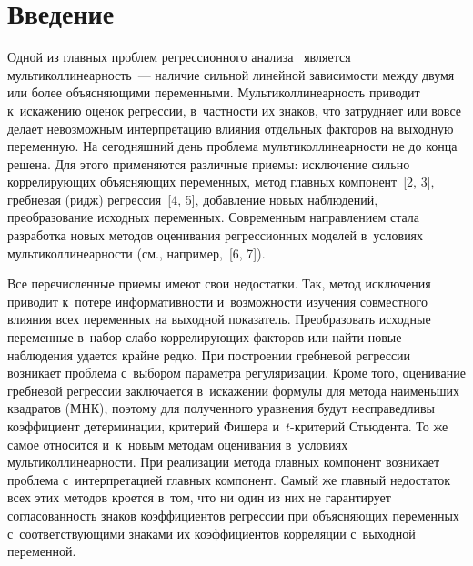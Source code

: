   
\vspace*{-4pt}



\thispagestyle{headings}

\begin{multicols}{2}

\label{st\stat}
  
\section{Введение}

\vspace*{-4pt}
  
  Одной из главных проблем регрессионного анализа~\cite{1-baz} является 
мультиколлинеарность~--- наличие сильной линейной за\-ви\-си\-мости меж\-ду 
двумя или более объ\-яс\-ня\-ющи\-ми переменными. Мультиколлинеарность 
приводит к~искажению оценок регрессии, в~част\-ности их знаков, что 
затрудняет или вовсе делает невозможным интерпретацию влияния отдельных 
факторов на выходную переменную. На сегодняшний день проб\-ле\-ма 
муль\-ти\-кол\-ли\-не\-ар\-ности не до конца решена. Для этого применяются различные 
приемы: исключение сильно кор\-ре\-ли\-ру\-ющих объ\-яс\-ня\-ющих переменных, метод 
главных компонент~[2, 3], греб\-не\-вая (ридж) ре\-грес\-сия~[4, 5], до\-бав\-ле\-ние новых 
наблюдений, преобразование исходных переменных. Современным 
на\-прав\-ле\-ни\-ем стала разработка новых методов оценивания регрессионных 
моделей в~условиях муль\-ти\-кол\-ли\-не\-ар\-ности (см., например,~[6, 7]). 

Все 
пе\-ре\-чис\-лен\-ные приемы имеют свои недостатки. Так, метод исключения 
приводит к~потере ин\-фор\-ма\-тив\-ности и~воз\-мож\-ности изуче\-ния совместного 
влияния всех переменных на выходной показатель. Преобразовать исходные 
переменные в~набор слабо кор\-ре\-ли\-ру\-ющих факторов или найти новые 
наблюдения удается крайне ред\-ко. При по\-стро\-ении греб\-не\-вой регрессии 
возникает проб\-ле\-ма с~выбором па\-ра\-мет\-ра регуляризации. Кроме того, 
оценивание греб\-не\-вой ре\-грес\-сии заключается в~искажении формулы для метода 
наименьших квад\-ра\-тов (МНК), поэтому для полученного уравнения будут 
несправедливы коэффициент детерминации, критерий Фишера и~$t$-кри\-те\-рий Стьюдента. 
То же самое относится и~к~новым методам оценивания в~условиях муль\-ти\-кол\-ли\-не\-ар\-ности. При реализации метода главных компонент 
возникает проб\-ле\-ма с~интерпретацией главных компонент. Самый же глав\-ный 
недостаток всех этих методов кроется в~том, что ни один из них не гарантирует 
со\-гла\-со\-ван\-ность знаков коэффициентов регрессии при объ\-яс\-ня\-ющих 
переменных с~со\-от\-вет\-ст\-ву\-ющи\-ми знаками их коэффициентов корреляции 
с~вы\-ход\-ной переменной.
  

\end{multicols}
